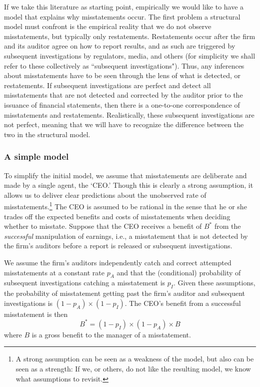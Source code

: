 If we take this literature as starting point, empirically we would like to have a model that explains why misstatements occur. 
The first problem a structural model must confront is the empirical reality that we do not observe misstatements, but typically only restatements.
Restatements occur after the firm and its auditor agree on how to report results, and as such are triggered by subsequent investigations by regulators, media, and others (for simplicity we shall refer to these collectively as ``subsequent investigations"). 
Thus, any inferences about misstatements have to be seen through the lens of what is detected, or restatements.
If subsequent investigations are perfect and detect all misstatements that are not detected and corrected by the auditor prior to the issuance of financial statements, then there is a one-to-one correspondence of misstatements and restatements. 
Realistically, these subsequent investigations are not perfect, meaning that we will have to recognize the difference between the two in the structural model.

\subsubsection{A simple model}
To simplify the initial model, we assume that misstatements  are deliberate and made by a single agent, the `CEO.'
Though this is clearly a strong assumption, it allows us to deliver clear predictions about the unobserved rate of misstatements.\footnote{
A strong assumption can be seen as a weakness of the model, but also can be seen as a strength:
If we, or others, do not like the resulting model, we know what assumptions to revisit.} 
The CEO is assumed to be rational in the sense that he or she trades off the expected benefits and costs of misstatements when deciding whether to misstate.
Suppose that the CEO receives a benefit of $B^*$ from the \emph{successful} manipulation of earnings, 
i.e., a misstatement that is not detected by the firm's auditors before a report is released or subsequent investigations. 

We assume the firm's auditors independently catch and correct attempted misstatements at a constant rate $p_A$ and that the (conditional) probability of subsequent investigations catching a misstatement is $p_I$.
Given these assumptions, the probability of misstatement getting past the firm's  auditor and subsequent investigations is $(1-p_A) \times (1 - p_I)$.
The CEO's benefit from a successful misstatement is then
$$ B^* = (1-p_I) \times (1-p_A) \times B$$
where $B$ is a gross benefit to the manager of a misstatement. 

